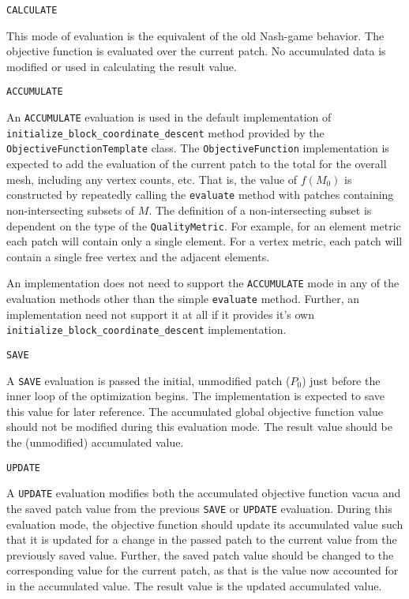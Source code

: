 \documentclass{article}
\begin{document}
\begin{description}

\item{\texttt{CALCULATE}}

This mode of evaluation is the equivalent of the old Nash-game behavior.  The objective function is evaluated over the current patch.  No accumulated data is modified or used in calculating the result value.

\item{\texttt{ACCUMULATE}}

An \texttt{ACCUMULATE} evaluation is used in the default implementation of \\ \texttt{initialize\_block\_coordinate\_descent} method provided by the \\ \texttt{ObjectiveFunctionTemplate} class.  The \texttt{ObjectiveFunction} implementation is expected to add the evaluation of the current patch to the total for the overall mesh, including any vertex counts, etc.  That is, the value of $f(M_0)$ is constructed by repeatedly calling the \texttt{evaluate} method with patches containing non-intersecting subsets of $M$.  The definition of a non-intersecting subset is dependent on the type of the \texttt{QualityMetric}.  For example, for an element metric each patch will contain only a single element.  For a vertex metric, each patch will contain a single free vertex and the adjacent elements.

An implementation does not need to support the \texttt{ACCUMULATE} mode in any of the evaluation methods other than the simple \texttt{evaluate}  method.  Further, an implementation need not support it at all if it provides it's own \texttt{initialize\_block\_coordinate\_descent} implementation.

\item{\texttt{SAVE}}

A \texttt{SAVE} evaluation is passed the initial, unmodified patch ($P_0$) just before the inner loop of the optimization begins.  The implementation is expected to save this value for later reference.  The accumulated global objective function value should not be modified during this evaluation mode.  The result value should be the (unmodified) accumulated value.

\item{\texttt{UPDATE}}

A \texttt{UPDATE} evaluation modifies both the accumulated objective function vacua and the saved patch value from the previous \texttt{SAVE} or \texttt{UPDATE} evaluation.  During this evaluation mode, the objective function should update its accumulated value such that it is updated for a change in the passed patch to the current value from the previously saved value.  Further, the saved patch value should be changed to the corresponding value for the current patch, as that is the value now accounted for in the accumulated value.  The result value is the updated accumulated value.


\end{description}
\end{document}

